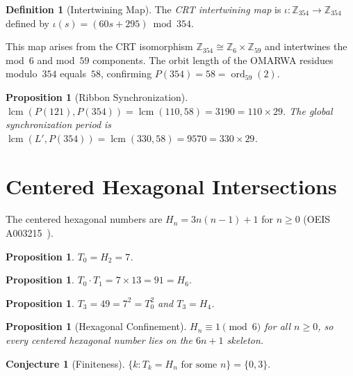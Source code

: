 \documentclass[11pt, a4paper]{article}
\theoremstyle{plain}
\newtheorem{proposition}[theorem]{Proposition}
\theoremstyle{definition}
\newtheorem{definition}[theorem]{Definition}
\newtheorem{conjecture}[theorem]{Conjecture}
\theoremstyle{remark}
\newcommand{\ord}{\operatorname{ord}}
\DeclareMathOperator{\lcm}{lcm}
\begin{document}
\begin{definition}[Intertwining Map]\label{def:intertwine}
The \emph{CRT intertwining map} is
$\iota : \mathbb{Z}_{354} \to \mathbb{Z}_{354}$ defined by
$\iota(s) = (60s + 295) \bmod 354$.
\end{definition}

This map arises from the CRT isomorphism
$\mathbb{Z}_{354} \cong \mathbb{Z}_6 \times \mathbb{Z}_{59}$ and
intertwines the mod~$6$ and mod~$59$ components. The orbit length of
the OMARWA residues modulo~$354$ equals~$58$, confirming
$P(354) = 58 = \ord_{59}(2)$.

\begin{proposition}[Ribbon Synchronization]\label{prop:ribbon-sync}
$\lcm(P(121), P(354)) = \lcm(110, 58) = 3190 = 110 \times 29$.
The global synchronization period is
$\lcm(L', P(354)) = \lcm(330, 58) = 9570 = 330 \times 29$.
\end{proposition}

\section{Centered Hexagonal Intersections}

The centered hexagonal numbers are $H_n = 3n(n-1) + 1$ for $n \geq 0$
(OEIS A003215~\cite{hex}).

\begin{proposition}\label{prop:h2}
$T_0 = H_2 = 7$.
\end{proposition}

\begin{proposition}\label{prop:h6}
$T_0 \cdot T_1 = 7 \times 13 = 91 = H_6$.
\end{proposition}

\begin{proposition}\label{prop:h4}
$T_3 = 49 = 7^2 = T_0^2$ and $T_3 = H_4$.
\end{proposition}

\begin{proposition}[Hexagonal Confinement]\label{prop:hex-conf}
$H_n \equiv 1 \pmod{6}$ for all $n \geq 0$, so every centered
hexagonal number lies on the $6n{+}1$ skeleton.
\end{proposition}

\begin{conjecture}[Finiteness]\label{conj:finite}
$\{k : T_k = H_n \text{ for some } n\} = \{0, 3\}$.
\end{conjecture}
\end{document}
